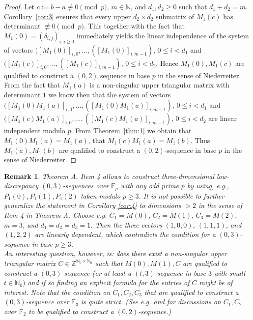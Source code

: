 \documentclass{article}
\newcommand{\NN}{\mathbb N}
\newcommand{\ZZ}{\mathbb Z}
\newcommand{\FF}{\mathbb F}
\newtheorem{remark}{Remark}
\begin{document}
\begin{proof} Let $c:=b-a\not\equiv 0\pmod{p}$, $m\in\NN$, and $d_1,d_2\geq 0$ such that $d_1+d_2=m$. 
Corollary~\ref{cor:3} ensures that every upper $d_2\times d_2$ submatrix of $M_1(c)$ has determinant $\not\equiv 0 \pmod{p}$. This together with the fact that $M_1(0)=(\delta_{i,j})_{i,j\geq 0}$ immediately yields the linear independence of the system of vectors $([M_1(0)]_{i,0},\ldots,([M_1(0)]_{i,m-1})$, $0\leq i<d_1$ and $([M_1(c)]_{i,0},\ldots,([M_1(c)]_{i,m-1})$, $0\leq i<d_2$. Hence $M_1(0),M_1(c)$ are qualified to construct a $(0,2)$ sequence in base $p$ in the sense of Niederreiter. 
From the fact that $M_1(a)$ is a non-singular upper triangular matrix with determinant $1$ we know then that the system of vectors $([M_1(0)M_1(a)]_{i,0},\ldots,([M_1(0)M_1(a)]_{i,m-1})$, $0\leq i<d_1$ and $([M_1(c)M_1(a)]_{i,0},\ldots,([M_1(c)M_1(a)]_{i,m-1})$, $0\leq i<d_2$ are linear independent modulo $p$. From Theorem~\ref{thm:1} we obtain that $M_1(0)M_1(a)=M_1(a)$, that $M_1(c)M_1(a)=M_1(b)$. Thus $M_1(a),M_1(b)$ are qualified to construct a $(0,2)$-sequence in base $p$ in the sense of Niederreiter. 
\end{proof}

\begin{remark}\label{rem:1}{\rm Theorem A, Item 4 allows to construct three-dimensional low-discrepancy $(0,3)$-sequences over $\FF_p$ with any odd prime $p$ by using, e.g., $P_1(0),P_1(1),P_1(2)$ taken modulo $p\geq 3$. It is not possible to further generalize the statement in Corollary \ref{cor:4} to dimensions $>2$ in the sense of Item 4 in Theorem A. Choose e.g. $C_1=M(0),\,C_2=M(1),\,C_3=M(2)$, $m=3$, and $d_1=d_2=d_3=1$. Then the three vectors $(1,0,0)$, $(1,1,1)$, and $(1,2,2)$ are linearly dependent, which contradicts the condition for a $(0,3)$-sequence in base $p\geq 3$. \\
An interesting question, however, is: does there exist a non-singular upper triangular matrix $C\in\ZZ^{\NN_0\times\NN_0}$ such that $M(0),M(1),C$ are qualified to construct a $(0,3)$-sequence (or at least a $(t,3)$-sequence in base $3$ with small $t\in\NN_0)$ and if so finding an explicit formula for the entries of $C$ might be of interest. Note that the condition on $C_1,C_2,C_3$ that are qualified to construct a $(0,3)$-sequence over $\FF_3$ is quite strict. (See e.g. \cite{hofkos} and \cite{hoflarAA} for discussions on $C_1,C_2$ over $\FF_2$ to be qualified to construct a $(0,2)$-sequence.)}
\end{remark}
\end{document}
